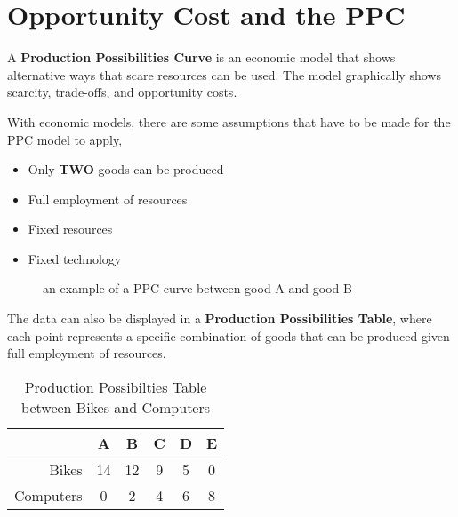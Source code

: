 \section{\normalfont Opportunity Cost and the PPC}
\begin{definition}
    A \textbf{Production Possibilities Curve} is an economic model that shows alternative ways that scare resources can be used. The model graphically shows scarcity, trade-offs, and opportunity costs.
\end{definition}
With economic models, there are some assumptions that have to be made for the PPC model to apply,
\begin{itemize}
    \item Only \textbf{TWO} goods can be produced
    \item Full employment of resources
    \item Fixed resources
    \item Fixed technology
\end{itemize}

\begin{figure}[h!]
\begin{center}
\end{center}
\caption{an example of a PPC curve between good A and good B}
\end{figure}

The data can also be displayed in a \textbf{Production Possibilities Table}, where each point represents a specific combination of goods that can be produced given full employment of resources. 

\begin{table}[h!]
    \begin{center}
      \begin{tabular}{r|c|c|c|c|c}
        \toprule %
        \textbf{} & \textbf{A} & \textbf{B} & \textbf{C} & \textbf{D} & \textbf{E}\\
        \midrule %
        Bikes & 14 & 12 & 9 & 5 & 0\\
        Computers & 0 & 2 & 4 & 6 & 8\\
        \bottomrule %
      \end{tabular}
      \caption{Production Possibilties Table between Bikes and Computers}
      \label{tab:table1}
    \end{center}
\end{table}

